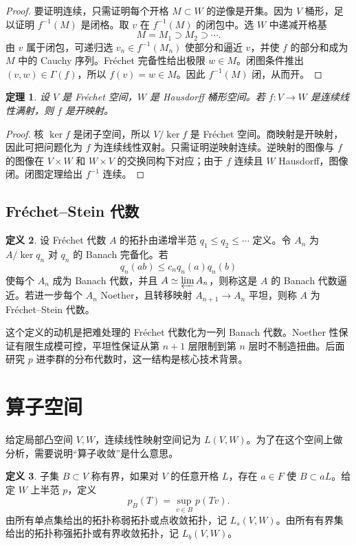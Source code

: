 \documentclass[11pt,a4paper,openany]{ctexbook}
\numberwithin{equation}{chapter}
\theoremstyle{plain}
\newtheorem{theorem}{定理}[chapter]
\theoremstyle{definition}
\newtheorem{definition}[theorem]{定义}
\theoremstyle{remark}
\begin{document}
\begin{proof}
要证明连续，只需证明每个开格 $M\subset W$ 的逆像是开集。因为 $V$ 桶形，足以证明 $f^{-1}(M)$ 是闭格。取 $v$ 在 $f^{-1}(M)$ 的闭包中。选 $W$ 中递减开格基
\[
  M=M_1\supset M_2\supset\cdots.
\]
由 $v$ 属于闭包，可递归选 $v_n\in f^{-1}(M_n)$ 使部分和逼近 $v$，并使 $f$ 的部分和成为 $M$ 中的 Cauchy 序列。Fréchet 完备性给出极限 $w\in M$。闭图条件推出 $(v,w)\in\Gamma(f)$，所以 $f(v)=w\in M$。因此 $f^{-1}(M)$ 闭，从而开。
\end{proof}

\begin{theorem}
设 $V$ 是 Fréchet 空间，$W$ 是 Hausdorff 桶形空间。若 $f:V\to W$ 是连续线性满射，则 $f$ 是开映射。
\end{theorem}

\begin{proof}
核 $\ker f$ 是闭子空间，所以 $V/\ker f$ 是 Fréchet 空间。商映射是开映射，因此可把问题化为 $f$ 为连续线性双射。只需证明逆映射连续。逆映射的图像与 $f$ 的图像在 $V\times W$ 和 $W\times V$ 的交换同构下对应；由于 $f$ 连续且 $W$ Hausdorff，图像闭。闭图定理给出 $f^{-1}$ 连续。
\end{proof}

\subsection{Fréchet--Stein 代数}

\begin{definition}
设 Fréchet 代数 $A$ 的拓扑由递增半范 $q_1\le q_2\le\cdots$ 定义。令 $A_n$ 为 $A/\ker q_n$ 对 $q_n$ 的 Banach 完备化。若
\[
  q_n(ab)\le c_nq_n(a)q_n(b)
\]
使每个 $A_n$ 成为 Banach 代数，并且 $A\simeq\varprojlim A_n$，则称这是 $A$ 的 Banach 代数逼近。若进一步每个 $A_n$ Noether，且转移映射 $A_{n+1}\to A_n$ 平坦，则称 $A$ 为 Fréchet--Stein 代数。
\end{definition}

这个定义的动机是把难处理的 Fréchet 代数化为一列 Banach 代数。Noether 性保证有限生成模可控，平坦性保证从第 $n+1$ 层限制到第 $n$ 层时不制造扭曲。后面研究 $p$ 进李群的分布代数时，这一结构是核心技术背景。

\section{算子空间}

给定局部凸空间 $V,W$，连续线性映射空间记为 $L(V,W)$。为了在这个空间上做分析，需要说明“算子收敛”是什么意思。

\begin{definition}
子集 $B\subset V$ 称有界，如果对 $V$ 的任意开格 $L$，存在 $a\in F$ 使 $B\subset aL$。给定 $W$ 上半范 $p$，定义
\[
  p_B(T)=\sup_{v\in B}p(Tv).
\]
由所有单点集给出的拓扑称弱拓扑或点收敛拓扑，记 $L_s(V,W)$。由所有有界集给出的拓扑称强拓扑或有界收敛拓扑，记 $L_b(V,W)$。
\end{definition}
\end{document}
